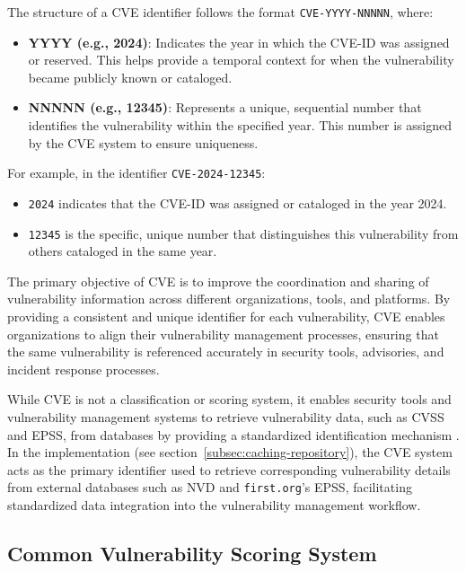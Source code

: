 The structure of a \ac{CVE} identifier follows the format \texttt{CVE-YYYY-NNNNN}, where:
\begin{itemize}
    \item \textbf{YYYY (e.g., 2024)}: Indicates the year in which the CVE-ID was assigned or reserved. This helps provide a temporal context for when the vulnerability became publicly known or cataloged.
    \item \textbf{NNNNN (e.g., 12345)}: Represents a unique, sequential number that identifies the vulnerability within the specified year. This number is assigned by the \ac{CVE} system to ensure uniqueness.
\end{itemize}

For example, in the identifier \texttt{CVE-2024-12345}:
\begin{itemize}
    \item \texttt{2024} indicates that the CVE-ID was assigned or cataloged in the year 2024.
    \item \texttt{12345} is the specific, unique number that distinguishes this vulnerability from others cataloged in the same year.
\end{itemize}

The primary objective of \ac{CVE} is to improve the coordination and sharing of vulnerability information across different organizations, tools, and platforms. By providing a consistent and unique identifier for each vulnerability, \ac{CVE} enables organizations to align their vulnerability management processes, ensuring that the same vulnerability is referenced accurately in security tools, advisories, and incident response processes.

While \ac{CVE} is not a classification or scoring system, it enables security tools and vulnerability management systems to retrieve vulnerability data, such as \ac{CVSS} and \ac{EPSS}, from databases by providing a standardized identification mechanism \autocite{mitre_corporation_overview_2024}. 
\\
In the implementation (see section~\ref{subsec:caching-repository}), the \ac{CVE} system acts as the primary identifier used to retrieve corresponding vulnerability details from external databases such as \ac{NVD} and \texttt{first.org}'s \ac{EPSS}, facilitating standardized data integration into the vulnerability management workflow.

\subsection{Common Vulnerability Scoring System}
\label{subsec:common-vulnerability-scoring-system}

